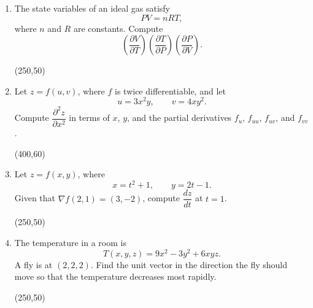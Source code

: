 \documentclass[12pt]{exam}
\begin{document}
\begin{enumerate}

\item The state variables of an ideal gas satisfy
\[
  PV=nRT,
\]
where $n$ and $R$ are constants. Compute
\[
  \left(\frac{\partial V}{\partial T}\right)
  \left(\frac{\partial T}{\partial P}\right)
  \left(\frac{\partial P}{\partial V}\right).
\]

\vfill
\begin{flushright}
\framebox(250,50){}
\end{flushright}

\item Let $z=f(u,v)$, where $f$ is twice differentiable, and let
\[
  u=3x^2y,\qquad v=4xy^2.
\]
Compute $\dfrac{\partial^2 z}{\partial x^2}$ in terms of $x$, $y$, and the
partial derivatives $f_u$, $f_{uu}$, $f_{uv}$, and $f_{vv}$.

\vfill
\begin{flushright}
\framebox(400,60){}
\end{flushright}

\newpage

\item Let $z=f(x,y)$, where
\[
  x=t^2+1,\qquad y=2t-1.
\]
Given that $\nabla f(2,1)=(3,-2)$, compute $\dfrac{dz}{dt}$ at $t=1$.

\vfill
\begin{flushright}
\framebox(250,50){}
\end{flushright}

\item The temperature in a room is
\[
  T(x,y,z)=9x^2-3y^2+6xyz.
\]
A fly is at $(2,2,2)$. Find the unit vector in the direction the fly should
move so that the temperature decreases most rapidly.

\vfill
\begin{flushright}
\framebox(250,50){}
\end{flushright}

\end{enumerate}
\end{document}
